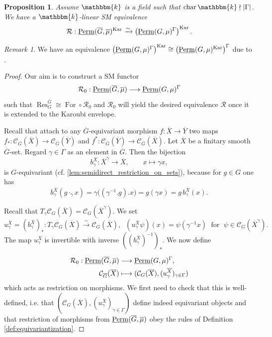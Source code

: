 \documentclass[11pt,a4paper]{amsart}
\theoremstyle{plain}%
\newtheorem{proposition}[lemma]{Proposition}
\theoremstyle{definition}
\theoremstyle{remark}
\newtheorem{remark}[lemma]{Remark}
\newcommand{\Perm}{\underline{{\rm Perm}}}
\newcommand{\kk}{\mathbbm{k}}
\newcommand{\Kar}{\mathrm{Kar}}
\newcommand{\cC}{\mathcal{C}}
\newcommand{\oG}{{\overline{G}}}
\newcommand{\oX}{{\overline{X}}}
\newcommand{\For}{\operatorname{For}}
\begin{document}
\begin{proposition}\label{prop:equivariantization-product}
Assume $\kk$ is a field such that $\operatorname{char}\kk\nmid |\Gamma| $.
We have a $\kk$-linear SM equivalence
\[
 \mathcal R:\Perm(\oG,\overline{\mu})^{\Kar}\xrightarrow{\sim}\left(\Perm(G, \mu)^{\Gamma}\right)^{\Kar}.
\]
\end{proposition}
\begin{remark}
    We have an equivalence $\left(\Perm(G, \mu)^{\Gamma}\right)^{\Kar}\cong \left(\Perm(G, \mu)^{\Kar}\right)^{\Gamma}$ due to \cite[Lemma~2.16]{Sun-equivariantization}. 
\end{remark}
\begin{proof} 

Our aim is to construct a SM functor 
\[ \mathcal R_0:\Perm(\oG,\overline{\mu})\longrightarrow\Perm(G, \mu)^{\Gamma} \]
such that $\operatorname{Res}^{\oG}_{G}\cong\For\circ \mathcal{ R}_0$ and $\mathcal{ R}_0$ will yield the desired equivalence $\mathcal{R}$ once it is extended to the Karoubi envelope.

Recall that \cite[\S7.7, Propositions~7.20 and~7.21(a)]{HS-oligomorphic} attach to any $\oG$-equivariant morphism $f:\oX\to \overline Y$ two maps $f_*: \mathcal{C}_{\oG}( \overline X) \to \mathcal{C}_{\oG}( \overline Y)$ and $f^*:\mathcal{C}_{\oG}( \overline Y) \to \mathcal{C}_{\oG}( \overline X)$. Let $\oX$ be a finitary smooth $\oG$-set. Regard $\gamma\in \Gamma$ as an element in $\oG$. Then the bijection
\[
 b_\gamma^\oX: \oX^{\gamma}\longrightarrow \oX,\qquad
 x\longmapsto\gamma x,
\]
is $G$-equivariant (cf. \cref{lem:semidirect_restriction_on_sets}), because for $g\in G$ one has
\[
 b_\gamma^\oX(g\cdot_{\gamma}x)
 =\gamma\bigl((\gamma^{-1}.g).x\bigr)
 =g(\gamma x)
 =g\,b_\gamma^\oX(x).
\]

Recall that $ T_\gamma\mathcal C_{G}(\oX)=\cC_G(\oX^{\gamma})$. We set
\[
 u_\gamma^\oX=(b_\gamma^\oX)_*:
 T_\gamma\mathcal C_{G}(\oX)
 \xrightarrow{\sim}\mathcal C_{G}(\oX), \;\;  (u_\gamma^\oX\psi)(x)=\psi(\gamma^{-1}x) \; \text{ for } \;  {\psi\in \cC_G(\oX^{\gamma})}.  
\]
The map $u_\gamma^\oX$ is invertible with inverse $((b_\gamma^\oX)^{-1})_*$. We now define

\[
 \begin{aligned}
 \mathcal R_0:\Perm(\oG,\overline{\mu})&\longrightarrow\Perm(G, \mu)^{\Gamma},\\
 \mathcal C_{\oG}(\oX)&\longmapsto
   (\mathcal C_{G}(\oX),(u_\gamma^\oX)_{\gamma\in \Gamma})
 \end{aligned}
\]
which acts as restriction on morphisms. We first need to check that this is well-defined, i.e. that $ (\mathcal C_{G}({\oX}),(u_\gamma^\oX)_{\gamma\in \Gamma})$ define indeed equivariant objects and that restriction of morphisms from $\Perm(\oG,\overline{\mu})$ obey the rules of Definition \ref{def:equivariantization}.


\end{proof}
\end{document}
